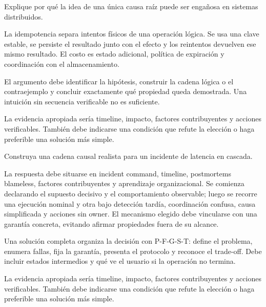 \documentclass[variant=guia,cover=institutional,mode=screen]{ua-engineering-v6-article}
\begin{document}
\begin{uaexercise}
Explique por qué la idea de una única causa raíz puede ser engañosa en sistemas distribuidos.
\end{uaexercise}
\begin{uaanswer}
La idempotencia separa intentos físicos de una operación lógica. Se usa una clave estable, se persiste el resultado junto con el efecto y los reintentos devuelven ese mismo resultado. El costo es estado adicional, política de expiración y coordinación con el almacenamiento.

El argumento debe identificar la hipótesis, construir la cadena lógica o el contraejemplo y concluir exactamente qué propiedad queda demostrada. Una intuición sin secuencia verificable no es suficiente.

La evidencia apropiada sería timeline, impacto, factores contribuyentes y acciones verificables. También debe indicarse una condición que refute la elección o haga preferible una solución más simple.
\end{uaanswer}

\begin{uaexercise}
Construya una cadena causal realista para un incidente de latencia en cascada.
\end{uaexercise}
\begin{uaanswer}
La respuesta debe situarse en incident command, timeline, postmortems blameless, factores contribuyentes y aprendizaje organizacional. Se comienza declarando el supuesto decisivo y el comportamiento observable; luego se recorre una ejecución nominal y otra bajo detección tardía, coordinación confusa, causa simplificada y acciones sin owner. El mecanismo elegido debe vincularse con una garantía concreta, evitando afirmar propiedades fuera de su alcance.

Una solución completa organiza la decisión con P-F-G-S-T: define el problema, enumera fallas, fija la garantía, presenta el protocolo y reconoce el trade-off. Debe incluir estados intermedios y qué ve el usuario si la operación no termina.

La evidencia apropiada sería timeline, impacto, factores contribuyentes y acciones verificables. También debe indicarse una condición que refute la elección o haga preferible una solución más simple.
\end{uaanswer}
\end{document}
